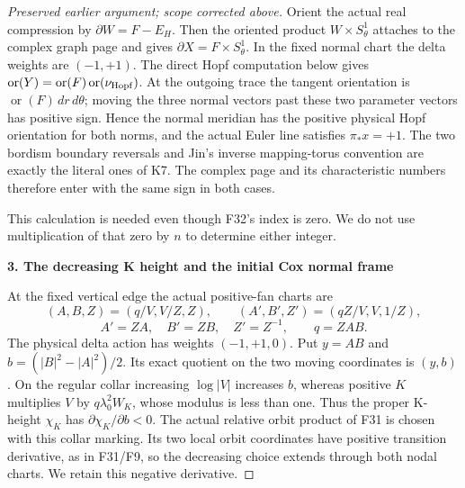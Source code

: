 \begin{proof}[Preserved earlier argument; scope corrected above]
Orient the actual real compression by \(\partial W=F-E_H\). Then the
oriented product \(W\times S^1_\theta\) attaches to the complex graph page and
gives \(\partial X=F\times S^1_\theta\). In the fixed normal chart the delta
weights are \((-1,+1)\). The direct Hopf computation below gives
\(\operatorname{or}(Y)=\operatorname{or}(F)\operatorname{or}(\nu_{\rm Hopf})\). At the outgoing trace the tangent orientation
is \(\operatorname{or}(F)\,dr\,d\theta\); moving the three normal vectors past these two
parameter vectors has positive sign. Hence the normal meridian has
the positive physical Hopf orientation for both norms, and the actual
Euler line satisfies \(\pi_* x=+1\). The two bordism boundary reversals
and Jin's inverse mapping-torus convention are exactly the literal
ones of K7. The complex page and its characteristic numbers therefore
enter with the same sign in both cases.

This calculation is needed even though F32's index is zero. We do not
use multiplication of that zero by \(n\) to determine either integer.

\par

\medskip\noindent\textbf{3. The decreasing K height and the initial Cox normal frame}

\par\nobreak

At the fixed vertical edge the actual positive-fan charts are
\[
 (A,B,Z)=(q/V,V/Z,Z),\qquad
 (A',B',Z')=(qZ/V,V,1/Z),
\]
\[
 A'=ZA,\quad B'=ZB,\quad Z'=Z^{-1},\qquad q=ZAB.
 \tag{OC.11}
\]
The physical delta action has weights \((-1,+1,0)\). Put
\(y=AB\) and \(b=(|B|^2-|A|^2)/2\). Its exact quotient on the two moving
coordinates is \((y,b)\). On the regular collar increasing \(\log|V|\)
increases \(b\), whereas positive \(K\) multiplies \(V\) by
\(q \lambda_0^2 W_K\), whose modulus is less than one. Thus the proper
K-height \(\chi_K\) has \(\partial\chi_K/\partial b<0\). The actual relative orbit product
of F31 is chosen with this collar marking. Its two local orbit
coordinates have positive transition derivative, as in F31/F9, so the
decreasing choice extends through both nodal charts. We retain this
negative derivative.


\end{proof}
